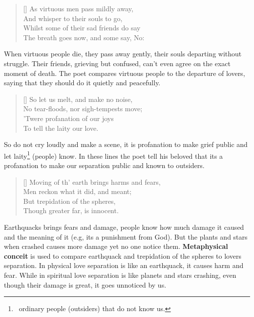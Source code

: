 \newpage
{}
\settowidth{\versewidth}{As virtuous men pass mildly away, \vin \vin}
\begin{verse}[\versewidth]
{\fontverse
As virtuous men pass mildly away,\\
\vin And whisper to their souls to go,\\
Whilst some of their sad friends do say\\
\vin The breath goes now, and some say, No:
} 
\end{verse}

When virtuous people die, they pass away gently, their souls departing without struggle.
Their friends, grieving but confused, can’t even agree on the exact moment of death.
The poet compares virtuous people to the departure of lovers, saying that they should 
do it quietly and peacefully. 

\begin{verse}[\versewidth]
{\fontverse
So let us melt, and make no noise,\\
\vin No tear-floods, nor sigh-tempests move;\\
'Twere profanation of our joys\\
\vin To tell the laity our love.
} 
\end{verse}

So do not cry loudly and make a scene, it is profanation to make 
grief public and let laity\footnote{\, ordinary people (outsiders) that do not know us.}
(people) know. In these lines the poet tell his beloved that its 
a profanation to make our separation public and known to outsiders.

\begin{verse}[\versewidth]
{\fontverse
Moving of th' earth brings harms and fears,\\
\vin Men reckon what it did, and meant;\\
But trepidation of the spheres,\\
\vin Though greater far, is innocent.
} 
\end{verse}

Earthquacks brings fears and damage, people know how much 
damage it caused and the meaning of it (e.g, its a punishment from God).
But the plants and stars when crashed causes more damage yet no one notice them.
\textbf{Metaphysical conceit} is used to compare earthquack and trepidation of the spheres
to lovers separation. In physical love separation is like an earthquack, it causes harm and fear.
While in spiritual love separation is like planets and stars crashing, even though their damage is 
great, it goes unnoticed by us.

